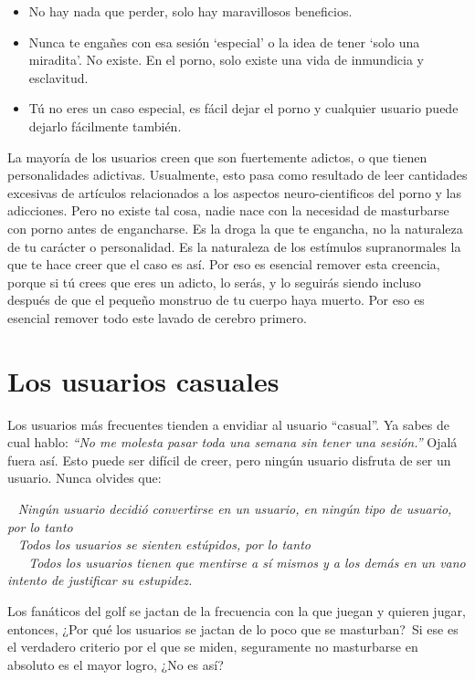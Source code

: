 \documentclass[
  openany]{book}
\providecommand{\tightlist}{%
  \setlength{\itemsep}{0pt}\setlength{\parskip}{0pt}}
\begin{document}
\begin{itemize}
\tightlist
\item
  No hay nada que perder, solo hay maravillosos beneficios.
\item
  Nunca te engañes con esa sesión `especial' o la idea de tener `solo una miradita'. No existe. En el porno, solo existe una vida de inmundicia y esclavitud.
\item
  Tú no eres un caso especial, es fácil dejar el porno y cualquier usuario puede dejarlo fácilmente también.
\end{itemize}

La mayoría de los usuarios creen que son fuertemente adictos, o que tienen personalidades adictivas. Usualmente, esto pasa como resultado de leer cantidades excesivas de artículos relacionados a los aspectos neuro-cientificos del porno y las adicciones. Pero no existe tal cosa, nadie nace con la necesidad de masturbarse con porno antes de engancharse. Es la droga la que te engancha, no la naturaleza de tu carácter o personalidad. Es la naturaleza de los estímulos supranormales la que te hace creer que el caso es así. Por eso es esencial remover esta creencia, porque si tú crees que eres un adicto, lo serás, y lo seguirás siendo incluso después de que el pequeño monstruo de tu cuerpo haya muerto. Por eso es esencial remover todo este lavado de cerebro primero.

\hypertarget{los-usuarios-casuales}{%
\chapter{Los usuarios casuales}\label{los-usuarios-casuales}}

Los usuarios más frecuentes tienden a envidiar al usuario ``casual''. Ya sabes de cual hablo: \emph{``No me molesta pasar toda una semana sin tener una sesión.''} Ojalá fuera así. Esto puede ser difícil de creer, pero ningún usuario disfruta de ser un usuario. Nunca olvides que:~

~ \emph{Ningún usuario decidió convertirse en un usuario, en ningún tipo de usuario, por lo tanto}\\
\hspace*{0.333em} ~ \emph{Todos los usuarios se sienten estúpidos, por lo tanto}\\
\hspace*{0.333em} ~ ~ \emph{Todos los usuarios tienen que mentirse a sí mismos y a los demás en un vano intento de justificar su estupidez.}

Los fanáticos del golf se jactan de la frecuencia con la que juegan y quieren jugar, entonces, ¿Por qué los usuarios se jactan de lo poco que se masturban?~Si ese es el verdadero criterio por el que se miden, seguramente no masturbarse en absoluto es el mayor logro, ¿No es así?
\end{document}
